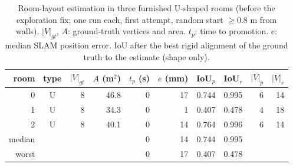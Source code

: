 \begin{table}[t]
\centering
\caption{Room-layout estimation in three furnished U-shaped rooms (before the exploration fix; one run each, first attempt, random start $\geq$0.8 m from walls). $|V|_{gt}$, $A$: ground-truth vertices and area. $t_p$: time to promotion. $e$: median SLAM position error. IoU after the best rigid alignment of the ground truth to the estimate (shape only).}
\label{tab:estimation-synthetic-U-before}
\begin{tabular}{r c r r r r r r r r}
\toprule
room & type & $|V|_{gt}$ & $A$ (m$^2$) & $t_p$ (s) & $e$ (mm) & IoU$_p$ & IoU$_r$ & $|V|_p$ & $|V|_r$ \\
\midrule
0 & U & 8 & 46.8 & 0 & 17 & 0.744 & 0.995 & 6 & 14 \\
1 & U & 8 & 34.3 & 0 & 1 & 0.407 & 0.478 & 4 & 18 \\
2 & U & 8 & 40.1 & 0 & 14 & 0.764 & 0.996 & 6 & 14 \\
\midrule
median & & & & 0 & 14 & 0.744 & 0.995 & & \\
worst & & & & 0 & 17 & 0.407 & 0.478 & & \\
\bottomrule
\end{tabular}
\end{table}
